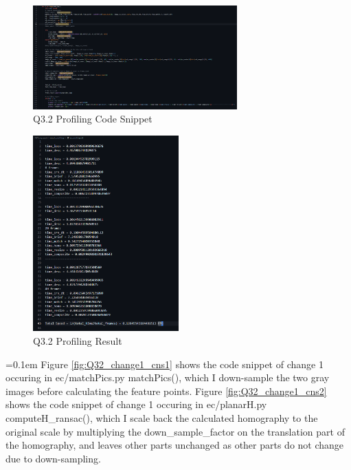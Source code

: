 \documentclass{article}
\begin{document}
	\begin{figure}[H]
		\centering
		\includegraphics[width=0.7\textwidth]{./Q3_2_ar_ec_profiling_cns1.png}  %
		\caption{Q3.2 Profiling Code Snippet}
		\label{fig:Q32profiling}
	\end{figure}	
	\begin{figure}[H]
		\centering
		\includegraphics[width=0.5\textwidth]{./Q3_2_ar_ec_profiling_result.png}  %
		\caption{Q3.2 Profiling Result}
		\label{fig:Q32profiling_result}
	\end{figure}	
	\hangindent=0.1em \hspace{0.1em}Figure \ref{fig:Q32_change1_cns1} shows the code snippet of change 1 occuring in ec/matchPics.py matchPics(), which I down-sample the two gray images before calculating the feature points. Figure \ref{fig:Q32_change1_cns2} shows the code snippet of change 1 occuring in ec/planarH.py computeH\_ransac(), which I scale back the calculated homography to the original scale by multiplying the down\_sample\_factor on the translation part of the homography, and leaves other parts unchanged as other parts do not change due to down-sampling.
\end{document}
